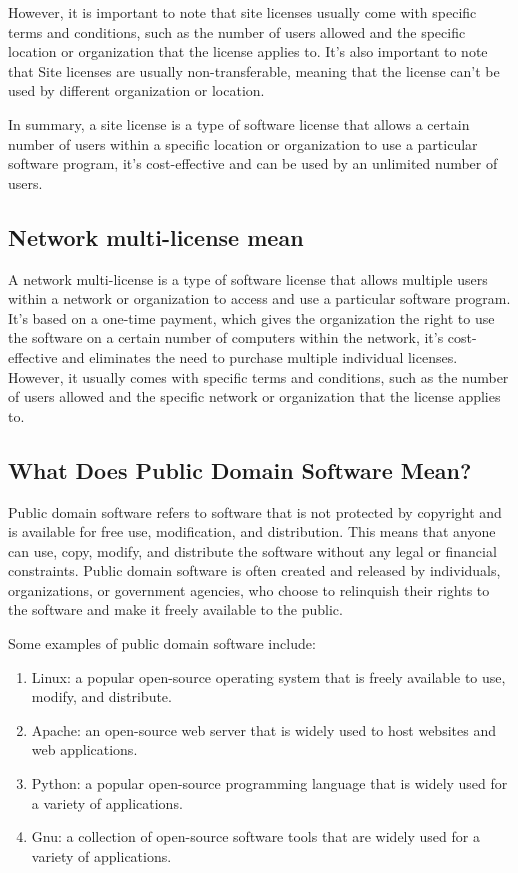 \documentclass[twocolumn, 12pt, a4paper]{article}
\begin{document}
However, it is important to note that site licenses usually come with specific
terms and conditions, such as the number of users allowed and the specific
location or organization that the license applies to. It's also important to
note that Site licenses are usually non-transferable, meaning that the license
can't be used by different organization or location.

In summary, a site license is a type of software license that allows a certain 
number of users within a specific location or organization to use a particular 
software program, it's cost-effective and can be used by an unlimited number of
users.

\subsection{Network multi-license mean}
A network multi-license is a type of software license that allows multiple
users within a network or organization to access and use a particular software
program. It's based on a one-time payment, which gives the organization the
right to use the software on a certain number of computers within the network,
it's cost-effective and eliminates the need to purchase multiple individual
licenses. However, it usually comes with specific terms and conditions, such as
the number of users allowed and the specific network or organization that the
license applies to.

\subsection{What Does Public Domain Software Mean?}
Public domain software refers to software that is not protected by copyright
and is available for free use, modification, and distribution. This means that
anyone can use, copy, modify, and distribute the software without any legal or
financial constraints. Public domain software is often created and released by
individuals, organizations, or government agencies, who choose to relinquish
their rights to the software and make it freely available to the public.

Some examples of public domain software include:

\begin{enumerate}
  \item Linux: a popular open-source operating system that is freely available
    to use, modify, and distribute. 
  \item Apache: an open-source web server that is widely used to host websites
    and web applications. 
  \item Python: a popular open-source programming language that is widely used
    for a variety of applications. 
  \item Gnu: a collection of open-source software tools that are widely used
    for a variety of applications. 
\end{enumerate}
\end{document}
